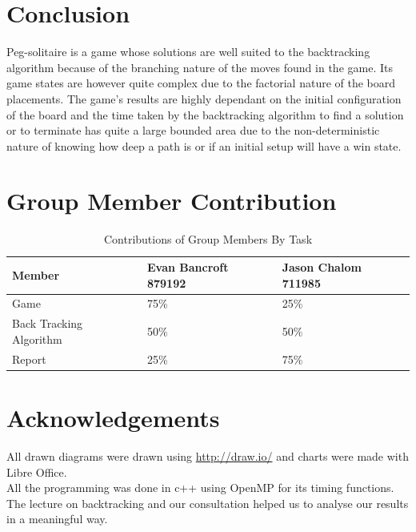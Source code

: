 \documentclass[a4paper]{article}
\begin{document}
\section{Conclusion}
Peg-solitaire is a game whose solutions are well suited to the backtracking algorithm because of the branching nature of the moves found in the game. Its game states are however quite complex due to the factorial nature of the board placements. The game's results are highly dependant on the initial configuration of the board and the time taken by the backtracking algorithm to find a solution or to terminate has quite a large bounded area due to the non-deterministic nature of knowing how deep a path is or if an initial setup will have a win state.  


\section{Group Member Contribution}
\begin{table}[H]
\centering
\label{contribution}
\begin{tabular}{|l|l|l|}
\hline
\textbf{Member}         & \textbf{Evan Bancroft 879192} & \textbf{Jason Chalom 711985} \\ \hline
Game                    & 75\%                          & 25\%                         \\ \hline
Back Tracking Algorithm & 50\%                          & 50\%                         \\ \hline
Report                  & 25\%                          & 75\%                         \\ \hline
\end{tabular}
\caption{Contributions of Group Members By Task}
\end{table}

\section*{Acknowledgements}
All drawn diagrams were drawn using \url{http://draw.io/} and charts were made with Libre Office.\\ 
All the programming was done in c++ using OpenMP for its timing functions.\\
The lecture on backtracking and our consultation helped us to analyse our results in a meaningful way.
\end{document}
